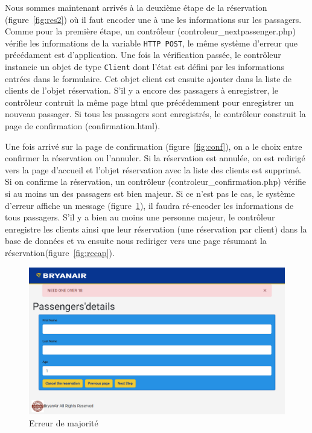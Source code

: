 \documentclass[12pt,a4paper]{article}
\begin{document}
			Nous sommes maintenant arrivés à la deuxième étape de la réservation (figure~\ref{fig:res2}) où il faut encoder une à une les informations sur les passagers. Comme pour la première étape, un contrôleur (controleur\_nextpassenger.php) vérifie les informations de la variable \texttt{HTTP POST}, le même système d'erreur que précédament est d'application. Une fois la vérification passée, le contrôleur instancie un objet de type \texttt{Client} dont l'état est défini par les informations entrées dans le formulaire. Cet objet client est ensuite ajouter dans la liste de clients de l'objet réservation. S'il y a encore des passagers à enregistrer, le contrôleur contruit la même page html que précédemment pour enregistrer un nouveau passager. Si tous les passagers sont enregistrés, le contrôleur construit la page de confirmation (confirmation.html).

			Une fois arrivé sur la page de confirmation (figure~\ref{fig:conf}), on a le choix entre confirmer la réservation ou l'annuler. Si la réservation est annulée, on est redirigé vers la page d'accueil et l'objet réservation avec la liste des clients est supprimé. Si on confirme la réservation, un contrôleur (controleur\_confirmation.php) vérifie si au moins un des passagers est bien majeur. Si ce n'est pas le cas, le système d'erreur affiche un message (figure~\ref{fig:ageError}), il faudra ré-encoder les informations de tous passagers. S'il y a bien au moins une personne majeur, le contrôleur enregistre les clients ainsi que leur réservation (une réservation par client) dans la base de données et va ensuite nous rediriger vers une page résumant la réservation(figure~\ref{fig:recap}).

			\begin{figure}
        \includegraphics[width=\textwidth]{ageError.png}
				\caption{Erreur de majorité}
				\label{fig:ageError}
			\end{figure}
\end{document}
